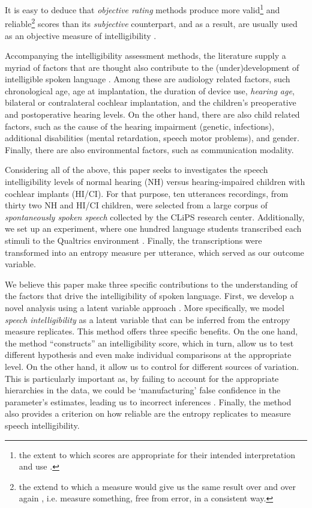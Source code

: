 It is easy to deduce that \textit{objective rating} methods produce more valid\footnote{the extent to which scores are appropriate for their intended interpretation and use \citep{Lesterhuis_2018, Trochim_2022}.} and reliable\footnote{the extend to which a measure would give us the same result over and over again \citep{Trochim_2022}, i.e. measure something, free from error, in a consistent way.} scores than its \textit{subjective} counterpart, and as a result, are usually used as an objective measure of intelligibility \citep{Boonen_et_al_2021, Faes_et_al_2021}.

Accompanying the intelligibility assessment methods, the literature supply a myriad of factors that are thought also contribute to the (under)development of intelligible spoken language \cite{Niparko_et_al_2010, Boons_et_al_2012, Gillis_2018, Fagan_et_al_2020}. Among these are audiology related factors, such chronological age, age at implantation, the duration of device use, \textit{hearing age}, bilateral or contralateral cochlear implantation, and the children's preoperative and postoperative hearing levels. On the other hand, there are also child related factors, such as the cause of the hearing impairment (genetic, infections), additional disabilities (mental retardation, speech motor problems), and gender. Finally, there are also environmental factors, such as communication modality. 

Considering all of the above, this paper seeks to investigates the speech intelligibility levels of normal hearing (NH) versus hearing-impaired children with cochlear implants (HI/CI). For that purpose, ten utterances recordings, from thirty two NH and HI/CI children, were selected from a large corpus of \textit{spontaneously spoken speech} collected by the CLiPS research center. Additionally, we set up an experiment, where one hundred language students transcribed each stimuli to the Qualtrics environment \cite{Qualtrics_2005}. Finally, the transcriptions were transformed into an entropy measure per utterance, which served as our outcome variable.

We believe this paper make three specific contributions to the understanding of the factors that drive the intelligibility of spoken language. First, we develop a novel analysis using a latent variable approach \cite{Everitt_1984}. More specifically, we model \textit{speech intelligibility} as a latent variable that can be inferred from the entropy measure replicates. This method offers three specific benefits. On the one hand, the method ``constructs'' an intelligibility score, which in turn, allow us to test different hypothesis and even make individual comparisons at the appropriate level. On the other hand, it allow us to control for different sources of variation. This is particularly important as, by failing to account for the appropriate hierarchies in the data, we could be `manufacturing' false confidence in the parameter's estimates, leading us to incorrect inferences \cite{McElreath_2020}. Finally, the method also provides a criterion on how reliable are the entropy replicates to measure speech intelligibility.

